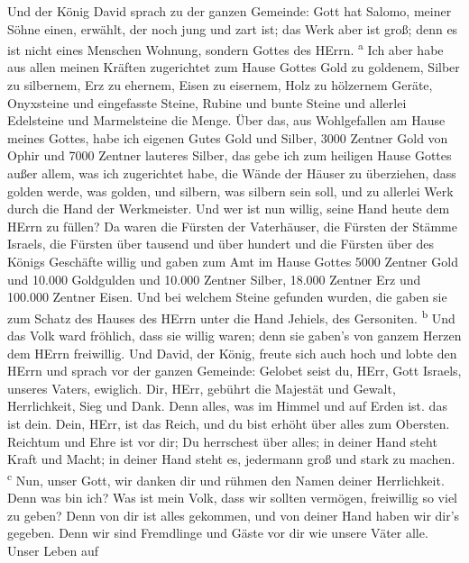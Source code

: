  Und der König David sprach zu der ganzen Gemeinde: Gott
hat Salomo, meiner Söhne einen, erwählt, der noch jung und zart ist; das
Werk aber ist groß; denn es ist nicht eines Menschen Wohnung, sondern
Gottes des HErrn. \textsuperscript{a}  Ich aber habe aus
allen meinen Kräften zugerichtet zum Hause Gottes Gold zu goldenem,
Silber zu silbernem, Erz zu ehernem, Eisen zu eisernem, Holz zu
hölzernem Geräte, Onyxsteine und eingefasste Steine, Rubine und bunte
Steine und allerlei Edelsteine und Marmelsteine die Menge.
 Über das, aus Wohlgefallen am Hause meines Gottes, habe
ich eigenen Gutes Gold und Silber,  3000 Zentner Gold von
Ophir und 7000 Zentner lauteres Silber, das gebe ich zum heiligen Hause
Gottes außer allem, was ich zugerichtet habe, die Wände der Häuser zu
überziehen,  dass golden werde, was golden, und silbern,
was silbern sein soll, und zu allerlei Werk durch die Hand der
Werkmeister. Und wer ist nun willig, seine Hand heute dem HErrn zu
füllen?  Da waren die Fürsten der Vaterhäuser, die Fürsten
der Stämme Israels, die Fürsten über tausend und über hundert und die
Fürsten über des Königs Geschäfte willig  und gaben zum
Amt im Hause Gottes 5000 Zentner Gold und 10.000 Goldgulden und 10.000
Zentner Silber, 18.000 Zentner Erz und 100.000 Zentner Eisen.
 Und bei welchem Steine gefunden wurden, die gaben sie zum
Schatz des Hauses des HErrn unter die Hand Jehiels, des Gersoniten.
\textsuperscript{b}  Und das Volk ward fröhlich, dass sie
willig waren; denn sie gaben's von ganzem Herzen dem HErrn freiwillig.
Und David, der König, freute sich auch hoch  und lobte
den HErrn und sprach vor der ganzen Gemeinde: Gelobet seist du, HErr,
Gott Israels, unseres Vaters, ewiglich.  Dir, HErr,
gebührt die Majestät und Gewalt, Herrlichkeit, Sieg und Dank. Denn
alles, was im Himmel und auf Erden ist. das ist dein. Dein, HErr, ist
das Reich, und du bist erhöht über alles zum Obersten. 
Reichtum und Ehre ist vor dir; Du herrschest über alles; in deiner Hand
steht Kraft und Macht; in deiner Hand steht es, jedermann groß und stark
zu machen. \textsuperscript{c}  Nun, unser Gott, wir
danken dir und rühmen den Namen deiner Herrlichkeit. 
Denn was bin ich? Was ist mein Volk, dass wir sollten vermögen,
freiwillig so viel zu geben? Denn von dir ist alles gekommen, und von
deiner Hand haben wir dir's gegeben.  Denn wir sind
Fremdlinge und Gäste vor dir wie unsere Väter alle. Unser Leben auf
